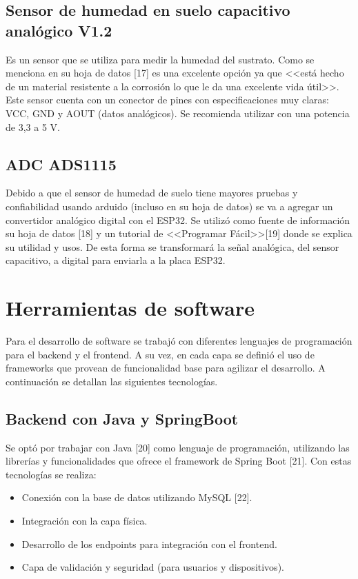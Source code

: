 \subsection{Sensor de humedad en suelo capacitivo analógico V1.2}
Es un sensor que se utiliza para medir la humedad del sustrato. Como se menciona en su hoja de datos [17] es una excelente opción ya que <<está hecho de un material resistente a la corrosión lo que le da una excelente vida útil>>. Este sensor cuenta con un conector de pines con especificaciones muy claras: VCC, GND y AOUT (datos analógicos). Se recomienda utilizar con una potencia de 3,3 a 5 V.

\subsection{ADC ADS1115}
Debido a que el sensor de humedad de suelo tiene mayores pruebas y confiabilidad usando arduido (incluso en su hoja de datos) se va a agregar un convertidor analógico digital con el ESP32. Se utilizó como fuente de información su hoja de datos [18] y un tutorial de <<Programar Fácil>>[19] donde se explica su utilidad y usos. De esta forma se transformará la señal analógica, del sensor capacitivo, a digital para enviarla a la placa ESP32.


\section{Herramientas de software}

Para el desarrollo de software se trabajó con diferentes lenguajes de programación para el backend y el frontend. A su vez, en cada capa se definió el uso de frameworks que provean de funcionalidad base para agilizar el desarrollo. A continuación se detallan  las siguientes tecnologías.

\subsection{Backend con Java y SpringBoot}
Se optó por trabajar con Java [20] como lenguaje de programación, utilizando las librerías y funcionalidades que ofrece el framework de Spring Boot [21]. Con estas tecnologías se realiza:
\begin{itemize}
\item Conexión con la base de datos utilizando MySQL [22].
\item Integración con la capa física.
\item Desarrollo de los endpoints para integración con el frontend.
\item Capa de validación y seguridad (para usuarios y dispositivos).
\end{itemize}

